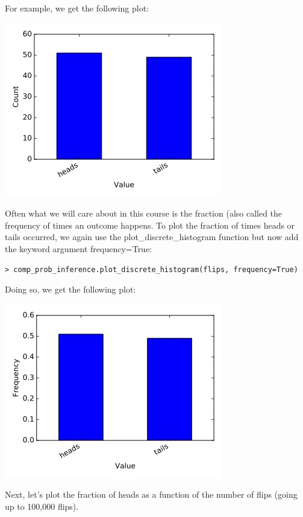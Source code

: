 \documentclass[6008notes.tex]{subfiles}
\begin{document}
For example, we get the following plot:

{\centering\includegraphics[scale=0.5]{images_sec-intro-histogram-counts} \par}

Often what we will care about in this course is the fraction (also called the frequency of times an outcome happens. To plot the fraction of times heads or tails occurred, we again use the plot\_discrete\_histogram function but now add the keyword argument frequency=True:

\begin{lstlisting}
> comp_prob_inference.plot_discrete_histogram(flips, frequency=True)
\end{lstlisting}

Doing so, we get the following plot:

{\centering\includegraphics[scale=0.5]{images_sec-intro-histogram-frequencies} \par}


Next, let's plot the fraction of heads as a function of the number of flips (going up to 100,000 flips).
\end{document}
